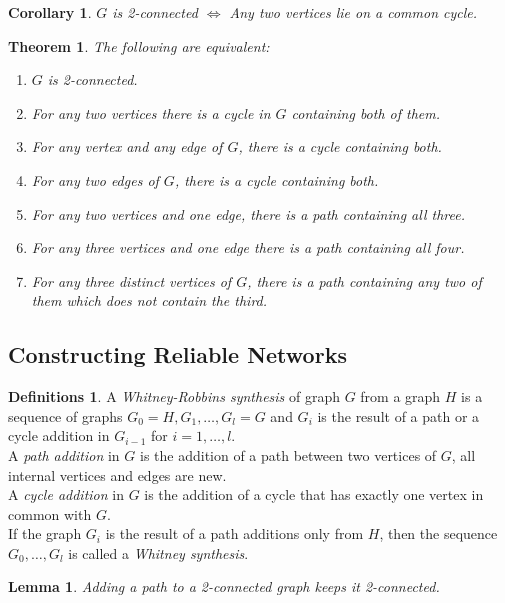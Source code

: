 \documentclass{article}
\newtheorem*{thm}{Theorem}
\newtheorem*{lem}{Lemma}
\newtheorem*{cor}{Corollary}
\theoremstyle{definition}
\newtheorem*{defns}{Definitions}
\begin{document}
\begin{cor}
$G$ is 2-connected $\iff$ Any two vertices lie on a common cycle.
\end{cor}

\begin{thm}
The following are equivalent:
\begin{enumerate}
\item $G$ is 2-connected.
\item For any two vertices there is a cycle in $G$ containing both of them.
\item For any vertex and any edge of $G$, there is a cycle containing both.
\item For any two edges of $G$, there is a cycle containing both.
\item For any two vertices and one edge, there is a path containing all three.
\item For any three vertices and one edge there is a path containing all four.
\item For any three distinct vertices of $G$, there is a path containing any two of them which does not contain the third.
\end{enumerate}
\end{thm}

\subsection{Constructing Reliable Networks}

\begin{defns}
A \emph{Whitney-Robbins synthesis} of graph $G$ from a graph $H$ is a sequence of graphs $G_0=H,G_1,\ldots,G_l=G$ and $G_i$ is the result of a path or a cycle addition in $G_{i-1}$ for $i=1,\ldots,l$. \\
A \emph{path addition} in $G$ is the addition of a path between two vertices of $G$, all internal vertices and edges are new. \\
A \emph{cycle addition} in $G$ is the addition of a cycle that has exactly one vertex in common with $G$. \\
If the graph $G_i$ is the result of a path additions only from $H$, then the sequence $G_0,\ldots,G_l$ is called a \emph{Whitney synthesis}.
\end{defns}


\begin{lem}
Adding a path to a 2-connected graph keeps it 2-connected.
\end{lem}
\end{document}
